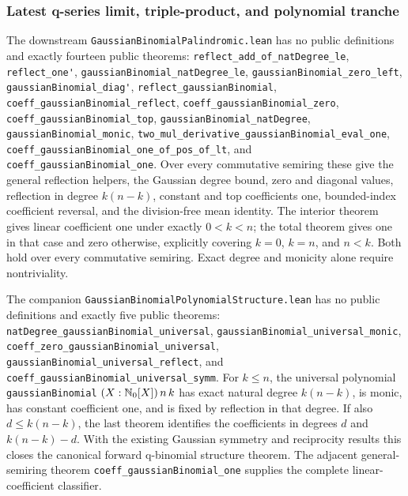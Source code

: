 \documentclass[11pt,oneside]{article}
\theoremstyle{definition}
\theoremstyle{remark}
\begin{document}
\subsubsection{Latest q-series limit, triple-product, and polynomial tranche}

The downstream \nolinkurl{GaussianBinomialPalindromic.lean} has no public
definitions and exactly fourteen public theorems:
\nolinkurl{reflect_add_of_natDegree_le}, \nolinkurl{reflect_one'},
\nolinkurl{gaussianBinomial_natDegree_le},
\nolinkurl{gaussianBinomial_zero_left},
\nolinkurl{gaussianBinomial_diag'}, \nolinkurl{reflect_gaussianBinomial},
\nolinkurl{coeff_gaussianBinomial_reflect},
\nolinkurl{coeff_gaussianBinomial_zero},
\nolinkurl{coeff_gaussianBinomial_top},
\nolinkurl{gaussianBinomial_natDegree},
\nolinkurl{gaussianBinomial_monic},
\nolinkurl{two_mul_derivative_gaussianBinomial_eval_one},
\nolinkurl{coeff_gaussianBinomial_one_of_pos_of_lt}, and
\nolinkurl{coeff_gaussianBinomial_one}.  Over every
commutative semiring these give the general reflection helpers, the Gaussian
degree bound, zero and diagonal values, reflection in degree \(k(n-k)\),
constant and top coefficients one, bounded-index coefficient reversal, and
the division-free mean identity.  The interior theorem gives linear coefficient
one under exactly \(0<k<n\); the total theorem gives one in that case and zero
otherwise, explicitly covering \(k=0\), \(k=n\), and \(n<k\).  Both hold over
every commutative semiring.  Exact degree and monicity alone require
nontriviality.

The companion \nolinkurl{GaussianBinomialPolynomialStructure.lean} has no
public definitions and exactly five public theorems:
\nolinkurl{natDegree_gaussianBinomial_universal},
\nolinkurl{gaussianBinomial_universal_monic},
\nolinkurl{coeff_zero_gaussianBinomial_universal},
\nolinkurl{gaussianBinomial_universal_reflect}, and
\nolinkurl{coeff_gaussianBinomial_universal_symm}.  For \(k\le n\), the
universal polynomial \nolinkurl{gaussianBinomial}
\((X:\mathbb{N}_{0}[X])\,n\,k\) has exact natural degree \(k(n-k)\), is monic,
has constant coefficient one, and is fixed by reflection in that degree.  If
also \(d\le k(n-k)\), the last theorem identifies the coefficients in degrees
\(d\) and \(k(n-k)-d\).  With the existing Gaussian symmetry and reciprocity
results this closes the canonical forward q-binomial structure theorem.  The
adjacent general-semiring theorem \nolinkurl{coeff_gaussianBinomial_one}
supplies the complete linear-coefficient classifier.
\end{document}
